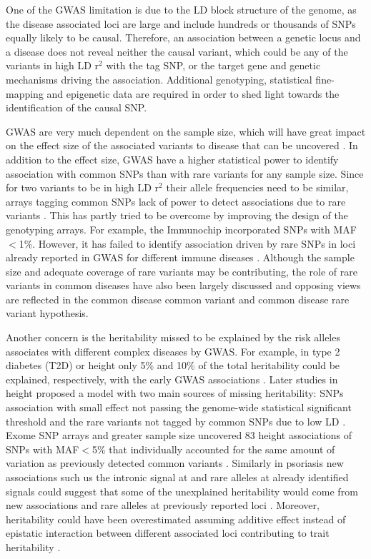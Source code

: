 One of the GWAS limitation is due to the LD block structure of the genome, as the disease associated loci are large and include hundreds or thousands of SNPs equally likely to be causal. Therefore, an association between a genetic locus and a disease does not reveal neither the causal variant, which could be any of the variants in high LD r$^2$ with the tag SNP, or the target gene and genetic mechanisms driving the association. Additional genotyping, statistical fine-mapping and epigenetic data are required in order to shed light towards the identification of the causal SNP.

GWAS are very much dependent on the sample size, which will have great impact on the effect size of the associated variants to disease that can be uncovered \parencite{Visscher2017}. In addition to the effect size, GWAS have a higher statistical power to identify association with common SNPs than with rare variants for any sample size. Since for two variants to be in high LD r$^2$ their allele frequencies need to be similar, arrays tagging common SNPs lack of power to detect associations due to rare variants \parencite{Wray2005}. This has partly tried to be overcome by improving the design of the genotyping arrays. For example, the Immunochip incorporated SNPs with MAF${<}$1\%. However, it has failed to identify association driven by rare SNPs in loci already reported in GWAS for different immune diseases \parencite{Visscher2017}. Although the sample size and adequate coverage of rare variants may be contributing, the role of rare variants in common diseases have also been largely discussed and opposing views are reflected in the common disease common variant and common disease rare variant hypothesis. 

Another concern is the heritability missed to be explained by the risk alleles associates with different complex diseases by GWAS. For example, in type 2 diabetes (T2D) or height only 5\% and 10\% of the total heritability could be explained, respectively, with the early GWAS associations \parencite{Ku2010, Yang2010}. Later studies in height proposed a model with two main sources of missing heritability: SNPs association with small effect not passing the genome-wide statistical significant threshold and the rare variants not tagged by common SNPs due to low LD \parencite{Yang2010}. Exome SNP arrays and greater sample size uncovered 83 height associations of SNPs with MAF${<}$5\% that individually accounted for the same amount of variation as previously detected common variants \parencite{Marouli2017}. Similarly in psoriasis new associations such us the intronic signal at \parencite{TNFSF15} and rare alleles at already identified signals could suggest that  some of the unexplained heritability would come from new associations and rare alleles at previously reported loci \parencite{Dand2017.}. Moreover, heritability could have been overestimated assuming additive effect instead of epistatic interaction between different associated loci contributing to trait heritability \parencite{Zuk2012}.

